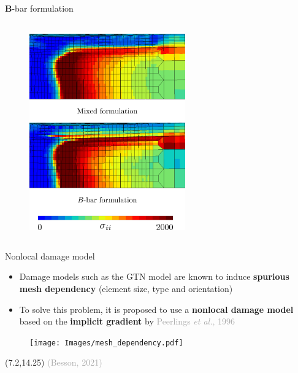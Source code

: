 \documentclass[9pt]{beamer}
\begin{document}
\begin{frame}{$\boldsymbol{B}$-bar formulation}
\begin{columns}
	\begin{column}{0.5\textwidth}
		\begin{figure}
        \centering
        \includegraphics[width=0.6\textwidth]{Images/pressure_Bbar.pdf}
    \end{figure} 
	\end{column}
\end{columns}

\end{frame}


\begin{frame}{Nonlocal damage model}

\begin{itemize}
	\item Damage models such as the GTN model are known to induce \textbf{spurious mesh dependency} (element size, type and orientation)
	\vspace{0.25cm}
	\item To solve this problem, it is proposed to use a \textbf{nonlocal damage model} based on the \textbf{implicit gradient} by \textcolor{darkgray}{Peerlings \textit{et al.}, 1996}
\end{itemize}

	\vspace{0.25cm}

	\begin{figure}
        \centering
        \texttt{[image: Images/mesh\_dependency.pdf]}
    \end{figure} 
    
    \begin{textblock}{5}(7.2,14.25)
        \textcolor{darkgray}{\footnotesize (Besson, 2021)}
    \end{textblock}

\end{frame}
\end{document}
